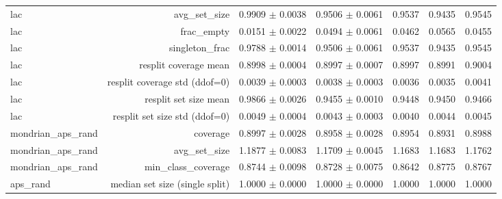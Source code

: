 \begin{table}
\begin{tabular}{lrrrrrr}
              lac &                             avg\_set\_size &                         0.9909 $\pm$ 0.0038 &                           0.9506 $\pm$ 0.0061 &     0.9537 &     0.9435 &     0.9545 \\
              lac &                               frac\_empty &                         0.0151 $\pm$ 0.0022 &                           0.0494 $\pm$ 0.0061 &     0.0462 &     0.0565 &     0.0455 \\
              lac &                           singleton\_frac &                         0.9788 $\pm$ 0.0014 &                           0.9506 $\pm$ 0.0061 &     0.9537 &     0.9435 &     0.9545 \\
              lac &                    resplit coverage mean &                         0.8998 $\pm$ 0.0004 &                           0.8997 $\pm$ 0.0007 &     0.8997 &     0.8991 &     0.9004 \\
              lac &            resplit coverage std (ddof=0) &                         0.0039 $\pm$ 0.0003 &                           0.0038 $\pm$ 0.0003 &     0.0036 &     0.0035 &     0.0041 \\
              lac &                    resplit set size mean &                         0.9866 $\pm$ 0.0026 &                           0.9455 $\pm$ 0.0010 &     0.9448 &     0.9450 &     0.9466 \\
              lac &            resplit set size std (ddof=0) &                         0.0049 $\pm$ 0.0004 &                           0.0043 $\pm$ 0.0003 &     0.0040 &     0.0044 &     0.0045 \\
mondrian\_aps\_rand &                                 coverage &                         0.8997 $\pm$ 0.0028 &                           0.8958 $\pm$ 0.0028 &     0.8954 &     0.8931 &     0.8988 \\
mondrian\_aps\_rand &                             avg\_set\_size &                         1.1877 $\pm$ 0.0083 &                           1.1709 $\pm$ 0.0045 &     1.1683 &     1.1683 &     1.1762 \\
mondrian\_aps\_rand &                       min\_class\_coverage &                         0.8744 $\pm$ 0.0098 &                           0.8728 $\pm$ 0.0075 &     0.8642 &     0.8775 &     0.8767 \\
         aps\_rand &           median set size (single split) &                         1.0000 $\pm$ 0.0000 &                           1.0000 $\pm$ 0.0000 &     1.0000 &     1.0000 &     1.0000 \\

\end{tabular}
\end{table}
